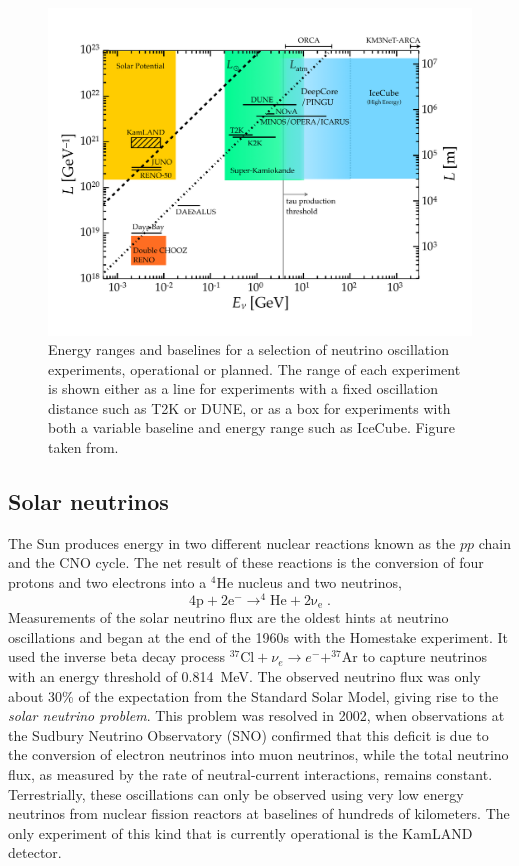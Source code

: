 \begin{figure}
    \centering
    \includegraphics{figures/theory/LvsE.pdf}
    \caption{Energy ranges and baselines for a selection of neutrino oscillation experiments, operational or planned.  The range of each experiment is shown either as a line for experiments with a fixed oscillation distance such as T2K or DUNE, or as a box for experiments with both a variable baseline and energy range such as IceCube. Figure taken from\cite{IceCube:2016xxt}.\label{fig:oscillation-experiments-overview}}
\end{figure}

\subsection{Solar neutrinos}
The Sun produces energy in two different nuclear reactions known as the $pp$ chain and the CNO cycle.
The net result of these reactions is the conversion of four protons and two electrons into a $\mathrm{^4He}$ nucleus and two neutrinos,
\begin{equation}
    \mathrm{4p + 2e^- \rightarrow ^4He + 2\nu_e }\;.
\end{equation}
Measurements of the solar neutrino flux are the oldest hints at neutrino oscillations and began at the end of the 1960s with the Homestake\cite{DAVIS199413} experiment.
It used the inverse beta decay process $^{37}\mathrm{Cl}+\nu_e \rightarrow e^- + ^{37}\mathrm{Ar}$ to capture neutrinos with an energy threshold of \SI{0.814}{MeV}.
The observed neutrino flux was only about 30\% of the expectation from the Standard Solar Model, giving rise to the \emph{solar neutrino problem}.
This problem was resolved in 2002, when observations at the Sudbury Neutrino Observatory (SNO) confirmed\cite{PhysRevLett.89.011301} that this deficit is due to the conversion of electron neutrinos into muon neutrinos, while the total neutrino flux, as measured by the rate of neutral-current interactions, remains constant.
Terrestrially, these oscillations can only be observed using very low energy neutrinos from nuclear fission reactors at baselines of hundreds of kilometers.
The only experiment of this kind that is currently operational is the KamLAND detector\cite{PhysRevLett.90.021802}.

